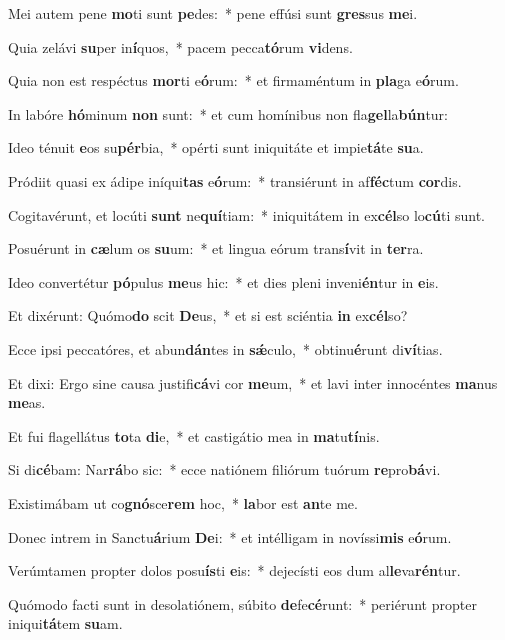 \item Mei autem pene \textbf{mo}ti sunt \textbf{pe}des:~* pene effúsi sunt \textbf{gres}sus \textbf{me}i.
\item Quia zelávi \textbf{su}per in\textbf{í}quos,~* pacem pecca\textbf{tó}rum \textbf{vi}dens.
\item Quia non est respéctus \textbf{mor}ti e\textbf{ó}rum:~* et firmaméntum in \textbf{pla}ga e\textbf{ó}rum.
\item In labóre \textbf{hó}minum \textbf{non} sunt:~* et cum homínibus non fla\textbf{gel}la\textbf{bún}tur:
\item Ideo ténuit \textbf{e}os su\textbf{pér}bia,~* opérti sunt iniquitáte et impie\textbf{tá}te \textbf{su}a.
\item Pródiit quasi ex ádipe iníqui\textbf{tas} e\textbf{ó}rum:~* transiérunt in af\textbf{féc}tum \textbf{cor}dis.
\item Cogitavérunt, et locúti \textbf{sunt} ne\textbf{quí}tiam:~* iniquitátem in ex\textbf{cél}so lo\textbf{cú}ti sunt.
\item Posuérunt in \textbf{cæ}lum os \textbf{su}um:~* et lingua eórum trans\textbf{í}vit in \textbf{ter}ra.
\item Ideo convertétur \textbf{pó}pulus \textbf{me}us hic:~* et dies pleni inveni\textbf{én}tur in \textbf{e}is.
\item Et dixérunt: Quómo\textbf{do} scit \textbf{De}us,~* et si est sciéntia \textbf{in} ex\textbf{cél}so?
\item Ecce ipsi peccatóres, et abun\textbf{dán}tes in \textbf{sǽ}culo,~* obtinu\textbf{é}runt di\textbf{ví}tias.
\item Et dixi: Ergo sine causa justifi\textbf{cá}vi cor \textbf{me}um,~* et lavi inter innocéntes \textbf{ma}nus \textbf{me}as.
\item Et fui flagellátus \textbf{to}ta \textbf{di}e,~* et castigátio mea in \textbf{ma}tu\textbf{tí}nis.
\item Si di\textbf{cé}bam: Nar\textbf{rá}bo sic:~* ecce natiónem filiórum tuórum \textbf{re}pro\textbf{bá}vi.
\item Existimábam ut co\textbf{gnó}sce\textbf{rem} hoc,~* \textbf{la}bor est \textbf{an}te me.
\item Donec intrem in Sanctu\textbf{á}rium \textbf{De}i:~* et intélligam in novíssi\textbf{mis} e\textbf{ó}rum.
\item Verúmtamen propter dolos posu\textbf{ís}ti \textbf{e}is:~* dejecísti eos dum al\textbf{le}va\textbf{rén}tur.
\item Quómodo facti sunt in desolatiónem, súbito \textbf{de}fe\textbf{cé}runt:~* periérunt propter iniqui\textbf{tá}tem \textbf{su}am.
